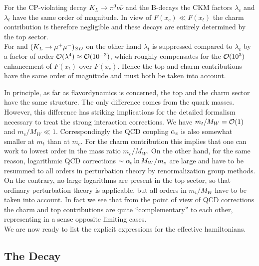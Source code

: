 For the CP-violating decay $K_L\to\pi^0\nu\bar\nu$ and the B-decays
the CKM factors $\lambda_c$ and $\lambda_t$ have the same order of
magnitude. In view of $F(x_c)\ll F(x_t)$ the charm contribution is
therefore negligible and these decays are entirely determined by the
top sector.\\
For \kpnn and $(K_L \to \mu^+\mu^-)_{SD}$ on the other hand $\lambda_t$ is
suppressed compared to $\lambda_c$ by a factor of order
${\cal O}(\lambda^4)\approx{\cal O}(10^{-3})$, which roughly compensates
for the ${\cal O}(10^3)$ enhancement of $F(x_t)$ over $F(x_c)$. Hence
the top and charm contributions have the same order of magnitude and
must both be taken into account.

In principle, as far as flavordynamics is concerned, the top and the
charm sector have the same structure. The only difference comes from
the quark masses. However, this difference has striking implications
for the detailed formalism necessary to treat the strong interaction
corrections. We have $m_t/M_W={\cal O}(1)$ and $m_c/M_W\ll 1$.
Correspondingly the QCD coupling $\alpha_{\rm s}$ is also somewhat smaller at
$m_t$ than at $m_c$. For the charm contribution this implies that one
can work to lowest order in the mass ratio $m_c/M_W$. On the other
hand, for the same reason, logarithmic QCD corrections
$\sim\alpha_{\rm s}\ln M_W/m_c$ are large and have to be resummed to all
orders in perturbation theory by renormalization group methods.
On the contrary, no large logarithms are present in the top sector, so that
ordinary perturbation theory is applicable, but all orders in $m_t/M_W$ have
to be taken into account. In fact we see that from the
point of view of QCD corrections the charm and top contributions are
quite ``complementary'' to each other, representing in a sense
opposite limiting cases.\\
We are now ready to list the explicit expressions for the effective
hamiltonians.

\subsection{The Decay \kpnn}
            \label{sec:HeffRareKB:kpnn}
